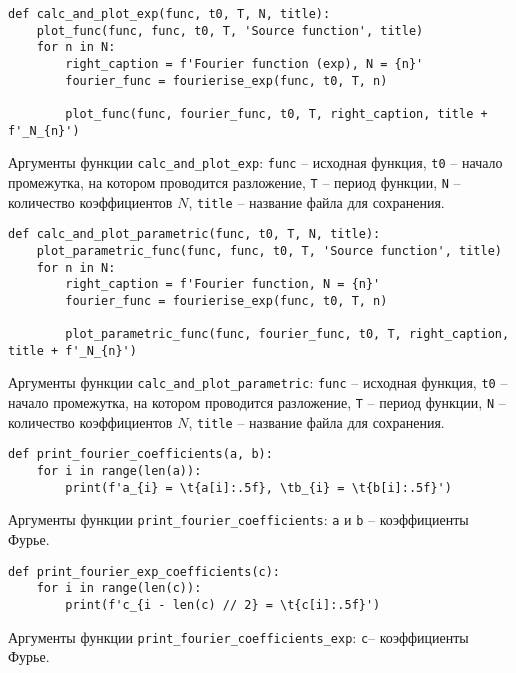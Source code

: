\begin{lstlisting}[style=python_white, caption=Функция для разложения в ряд Фурье с различными значениями $N$, label=lst:calc_and_plot_exp]
def calc_and_plot_exp(func, t0, T, N, title):   
    plot_func(func, func, t0, T, 'Source function', title)
    for n in N:
        right_caption = f'Fourier function (exp), N = {n}'
        fourier_func = fourierise_exp(func, t0, T, n)
        
        plot_func(func, fourier_func, t0, T, right_caption, title + f'_N_{n}')
\end{lstlisting}
Аргументы функции \texttt{calc\_and\_plot\_exp}: \texttt{func} -- исходная функция, \texttt{t0} -- начало промежутка, на котором проводится разложение, \texttt{T} -- период функции, \texttt{N} -- количество коэффициентов $N$, \texttt{title} -- название файла для сохранения.
\newline
\begin{lstlisting}[style=python_white, caption=Функция для разложения в ряд Фурье с различными значениями $N$ (параметрическая функция), label=lst:calc_and_plot_exp]
def calc_and_plot_parametric(func, t0, T, N, title):
    plot_parametric_func(func, func, t0, T, 'Source function', title)
    for n in N:
        right_caption = f'Fourier function, N = {n}'
        fourier_func = fourierise_exp(func, t0, T, n)
        
        plot_parametric_func(func, fourier_func, t0, T, right_caption, title + f'_N_{n}')
\end{lstlisting}
Аргументы функции \texttt{calc\_and\_plot\_parametric}: \texttt{func} -- исходная функция, \texttt{t0} -- начало промежутка, на котором проводится разложение, \texttt{T} -- период функции, \texttt{N} -- количество коэффициентов $N$, \texttt{title} -- название файла для сохранения.
\newline

\begin{lstlisting}[style=python_white, caption=Функция для вывода коэффициентов, label=lst:print_fourier_coefficients]
def print_fourier_coefficients(a, b):
    for i in range(len(a)):
        print(f'a_{i} = \t{a[i]:.5f}, \tb_{i} = \t{b[i]:.5f}')
\end{lstlisting}
Аргументы функции \texttt{print\_fourier\_coefficients}: \texttt{a} и \texttt{b} -- коэффициенты Фурье.
\newline

\begin{lstlisting}[style=python_white, caption=Функция для вывода коэффициентов, label=lst:print_fourier_coefficients_exp]
def print_fourier_exp_coefficients(c):
    for i in range(len(c)):
        print(f'c_{i - len(c) // 2} = \t{c[i]:.5f}')
\end{lstlisting}
Аргументы функции \texttt{print\_fourier\_coefficients\_exp}: \texttt{c}-- коэффициенты Фурье.
\newline

